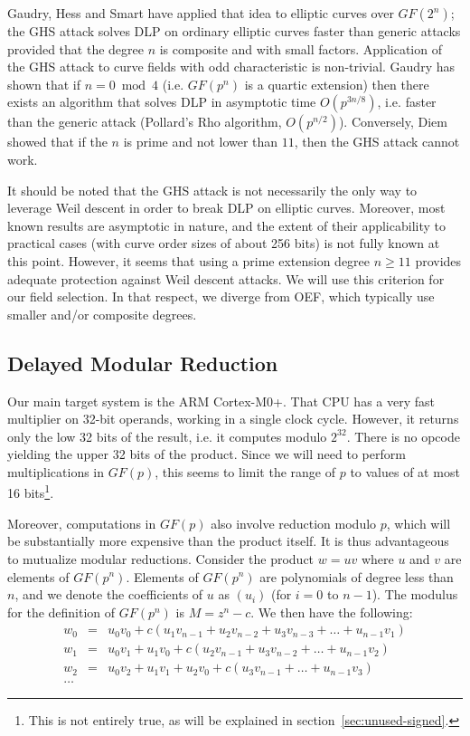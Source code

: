 \documentclass{llncs}
\newcommand{\GF}{GF}
\begin{document}
Gaudry, Hess and Smart\cite{GauHesSma2002} have applied that idea to
elliptic curves over $\GF(2^n)$; the GHS attack solves DLP on ordinary
elliptic curves faster than generic attacks provided that the degree $n$
is composite and with small factors. Application of the GHS attack to
curve fields with odd characteristic is non-trivial\cite{AriMatNagShi2004}.
Gaudry\cite{Gau2009} has shown that if $n = 0\bmod 4$ (i.e. $\GF(p^n)$
is a quartic extension) then there exists an algorithm that
solves DLP in asymptotic time $O(p^{3n/8})$, i.e. faster than the
generic attack (Pollard's Rho algorithm, $O(p^{n/2})$). Conversely,
Diem\cite{Die2003} showed that if the $n$ is prime and not lower
than $11$, then the GHS attack cannot work.

It should be noted that the GHS attack is not necessarily the only way
to leverage Weil descent in order to break DLP on elliptic curves.
Moreover, most known results are asymptotic in nature, and the extent of
their applicability to practical cases (with curve order sizes of about
256 bits) is not fully known at this point. However, it seems that
using a prime extension degree $n \geq 11$ provides adequate protection
against Weil descent attacks. We will use this criterion for our field
selection. In that respect, we diverge from OEF, which typically use
smaller and/or composite degrees.

\subsection{Delayed Modular Reduction}\label{sec:field-delayed-reduction}

Our main target system is the ARM Cortex-M0+. That CPU has a very fast
multiplier on 32-bit operands, working in a single clock cycle. However,
it returns only the low 32 bits of the result, i.e. it computes modulo
$2^{32}$. There is no opcode yielding the upper 32 bits of the product.
Since we will need to perform multiplications in $\GF(p)$, this seems to
limit the range of $p$ to values of at most 16 bits\footnote{This is not
entirely true, as will be explained in
section~\ref{sec:unused-signed}.}.

Moreover, computations in $\GF(p)$ also involve reduction modulo $p$,
which will be substantially more expensive than the product itself. It
is thus advantageous to mutualize modular reductions. Consider the
product $w = uv$ where $u$ and $v$ are elements of $\GF(p^n)$. Elements
of $\GF(p^n)$ are polynomials of degree less than $n$, and we denote
the coefficients of $u$ as $(u_i)$ (for $i = 0$ to $n-1$). The modulus
for the definition of $\GF(p^n)$ is $M = z^n - c$. We then have the
following:
\begin{eqnarray*}
    w_0 &=& u_0 v_0 + c (u_1 v_{n-1} + u_2 v_{n-2} + u_3 v_{n-3} + \dots + u_{n-1} v_1) \\
    w_1 &=& u_0 v_1 + u_1 v_0 + c (u_2 v_{n-1} + u_3 v_{n-2} + \dots + u_{n-1} v_2) \\
    w_2 &=& u_0 v_2 + u_1 v_1 + u_2 v_0 + c (u_3 v_{n-1} + \dots + u_{n-1} v_3) \\
    \dots
\end{eqnarray*}
\end{document}
